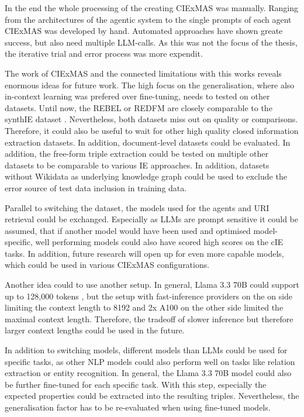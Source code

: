 \documentclass[a4paper,oneside,bibliography=totoc]{scrbook}
\begin{document}
In the end the whole processing of the creating CIExMAS was manually. Ranging from the architectures of the agentic system to the single prompts of each agent CIExMAS was developed by hand. Automated approaches have shown greate success, but also need multiple \ac{LLM}-calls. As this was not the focus of the thesis, the iterative trial and error process was more expendit.

The work of CIExMAS and the connected limitations with this works reveals enormous ideas for future work. The high focus on the generalisation, where also in-context learning was prefered over fine-tuning, needs to tested on other datasets. Until now, the REBEL or REDFM are closely comparable to the synthIE dataset \cite{HuguetCabot2021,Cabot2023}. Nevertheless, both datasets miss out on quality or comparisons. Therefore, it could also be useful to wait for other high quality closed information extraction datasets. In addition, document-level datasets could be evaluated. In addition, the free-form triple extraction could be tested on multiple other datasets to be comparable to various \ac{IE} approaches. In addition, datasets without Wikidata as underlying knowledge graph could be used to exclude the error source of test data inclusion in training data.

Parallel to switching the dataset, the models used for the agents and URI retrieval could be exchanged. Especially as \acp{LLM} are prompt sensitive it could be assumed, that if another model would have been used and optimised model-specific, well performing models could also have scored high scores on the \ac{cIE} tasks. In addition, future research will open up for even more capable models, which could be used in various CIExMAS configurations.

Another idea could to use another setup. In general, Llama 3.3 70B could support up to 128,000 tokens \cite{Meta2024}, but the setup with fast-inference providers on the on side limiting the context length to 8192 and 2x A100 on the other side limited the maximal context length. Therefore, the tradeoff of slower inference but therefore larger context lengths could be used in the future.

In addition to switching models, different models than \acp{LLM} could be used for specific tasks, as other \ac{NLP} models could also perform well on tasks like relation extraction or entity recognition. In general, the Llama 3.3 70B model could also be further fine-tuned for each specific task. With this step, especially the expected properties could be extracted into the resulting triples. Nevertheless, the generalisation factor has to be re-evaluated when using fine-tuned models.
\end{document}
